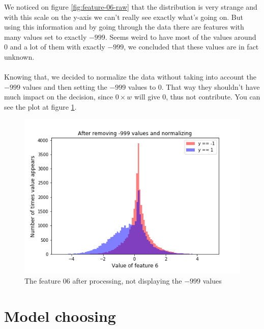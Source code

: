 \documentclass[10pt,conference,compsocconf]{IEEEtran}
\begin{document}
We noticed on figure \ref{fig:feature-06-raw} that the distribution is very strange and with this scale on the y-axis we can't really see exactly what's going on. But using this information and by going through the data there are features with many values set to exactly $-999$. Seems weird to have most of the values around 0 and a lot of them with exactly $-999$, we concluded that these values are in fact unknown.\\\\
Knowing that, we decided to normalize the data without taking into account the $-999$ values and then setting the $-999$ values to $0$. That way they shouldn't have much impact on the decision, since $0 \times w$ will give 0, thus not contribute. You can see the plot at figure \ref{fig:feature-06-processed}.
\begin{figure}[h!]
	\centering
  \includegraphics[width=\columnwidth]{graph-features/feature-06-processed.png}
  \caption{The feature 06 after processing, not displaying the $-999$ values}
	\label{fig:feature-06-processed}
\end{figure}


\section{Model choosing}
\end{document}
